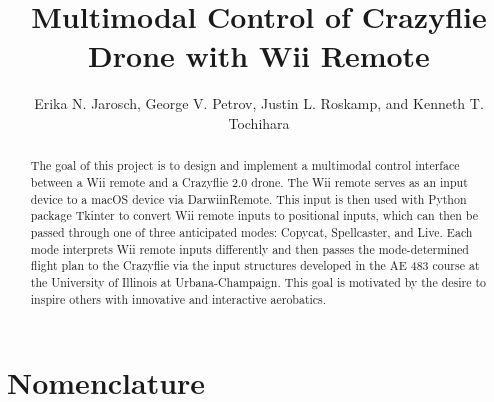 \documentclass[conf]{new-aiaa}
\title{Multimodal Control of Crazyflie Drone with Wii Remote}
\author{Erika N. Jarosch, George V. Petrov, Justin L. Roskamp, and Kenneth T. Tochihara}
\affil{University of Illinois at Urbana-Champaign, Urbana, IL, 61820}
\begin{document}
\maketitle

\begin{abstract}
The goal of this project is to design and implement a multimodal control interface between a Wii remote and a Crazyflie 2.0 drone. The Wii remote serves as an input device to a macOS device via DarwiinRemote. This input is then used with Python package Tkinter to convert Wii remote inputs to positional inputs, which can then be passed through one of three anticipated modes: Copycat, Spellcaster, and Live. Each mode interprets Wii remote inputs differently and then passes the mode-determined flight plan to the Crazyflie via the input structures developed in the AE 483 course at the University of Illinois at Urbana-Champaign. This goal is motivated by the desire to inspire others with innovative and interactive aerobatics.

\end{abstract}

\section{Nomenclature}

\end{document}
